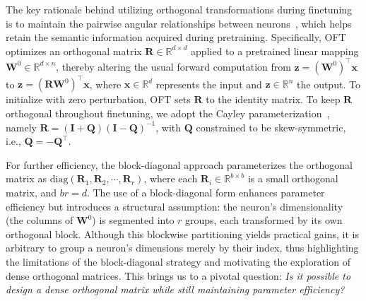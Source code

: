 The key rationale behind utilizing orthogonal transformations during finetuning is to maintain the pairwise angular relationships between neurons~\cite{liu2018learning,liu2021orthogonal,qiu2023controlling}, which helps retain the semantic information acquired during pretraining. Specifically, OFT optimizes an orthogonal matrix $\bm{R}\in\mathbb{R}^{d\times d}$ applied to a pretrained linear mapping $\bm{W}^0\in\mathbb{R}^{d\times n}$, thereby altering the usual forward computation from $\bm{z}=(\bm{W}^0)^\top\bm{x}$ to $\bm{z}=(\bm{R}\bm{W}^0)^\top\bm{x}$, where $\bm{x}\in\mathbb{R}^{d}$ represents the input and $\bm{z}\in\mathbb{R}^{n}$ the output. To initialize with zero perturbation, OFT sets $\bm{R}$ to the identity matrix. To keep $\bm{R}$ orthogonal throughout finetuning, we adopt the Cayley parameterization~\cite{qiu2023controlling,liu2021orthogonal}, namely $\bm{R}=(\bm{I}+\bm{Q})(\bm{I}-\bm{Q})^{-1}$, with $\bm{Q}$ constrained to be skew-symmetric, i.e., $\bm{Q}=-\bm{Q}^\top$.

For further efficiency, the block-diagonal approach parameterizes the orthogonal matrix as $\text{diag}(\bm{R}_1,\bm{R}_2,\cdots,\bm{R}_r)$, where each $\bm{R}_i\in\mathbb{R}^{b\times b}$ is a small orthogonal matrix, and $br=d$. The use of a block-diagonal form enhances parameter efficiency but introduces a structural assumption: the neuron's dimensionality (the columns of $\bm{W}^0$) is segmented into $r$ groups, each transformed by its own orthogonal block. Although this blockwise partitioning yields practical gains, it is arbitrary to group a neuron's dimensions merely by their index, thus highlighting the limitations of the block-diagonal strategy and motivating the exploration of dense orthogonal matrices. This brings us to a pivotal question: \emph{Is it possible to design a dense orthogonal matrix while still maintaining parameter efficiency?}

